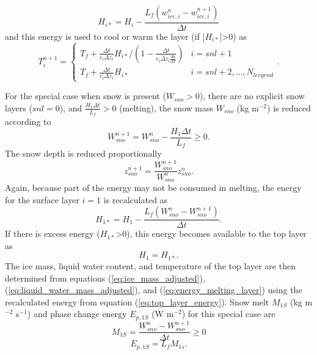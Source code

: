 \documentclass[12pt,authoryear]{elsarticle}
\numberwithin{equation}{section} %
\begin{document}
\begin{equation}
H_{i*}=H_{i}-\frac{L_{f}(w_{ice,i}^{n}-w_{ice,i}^{n+1})}{\Delta t}
\end{equation}
and this energy is used to cool or warm the layer (if |$H_{i*}$|>0) as
\begin{equation}
\label{eq:energy_melting_layer}
T_{i}^{n+1} = 
\begin{cases}
T_{f}+\frac{\Delta t}{c_{i}\Delta z_{i}}H_{i*}/\left(1-\frac{\Delta t}{c_{i}\Delta z_{i}\frac{\partial h}{\partial T}}\right) & i=snl+1 \\
T_{f}+\frac{\Delta t}{c_{i}\Delta z_{i}}H_{i*} & i=snl+2,...,N_{levgrnd}
\end{cases}.
\end{equation}

For the special case when snow is present ($W_{sno}>0$), there are no explicit snow layers ($snl=0$), and $\frac{H_\textrm{1}\Delta t}{L_{f}}>$0 (melting), the snow mass $W_{sno}$ (kg m$^{-2}$) is reduced
according to
\begin{equation}
W_{sno}^{n+1} = W_{sno}^{n}-\frac{H_{1}\Delta t}{L_{f}} \geq 0.
\end{equation}
The snow depth is reduced proportionally
\begin{equation}
z_{sno}^{n+1} = \frac{W_{sno}^{n+1}}{W_{sno}^{n}}z_{sno}^{n}.
\end{equation}
Again, because part of the energy may not be consumed in melting, the energy for the surface layer $i=1$ is recalculated as
\begin{equation}
H_{1*}=H_{1}-\frac{L_{f}(W_{sno}^{n}-W_{sno}^{n+1})}{\Delta t}.
\end{equation}
If there is excess energy ($H_{1*}$>0), this energy becomes available to the top layer as
\begin{equation}
\label{eq:top_layer_energy}
H_{1} = H_{1*}.
\end{equation}
The ice mass, liquid water content, and temperature of the top layer are then determined from equations (\ref{eq:ice_mass_adjusted}), (\ref{eq:liquid_water_mass_adjusted}), and (\ref{eq:energy_melting_layer}) using the recalculated energy from equation (\ref{eq:top_layer_energy}). Snow melt $M_{1S}$ (kg m$^{-2}$ s$^{-1}$) and phase change energy $E_{p,1S}$ (W m$^{-2}$) for this special case are
\begin{equation}
M_{1S}=\frac{W_{sno}^{n}-W_{sno}^{n+1}}{\Delta t} \geq 0
\end{equation}
\begin{equation}
E_{p,1S} = L_{f}M_{1s}.
\end{equation}
\end{document}
